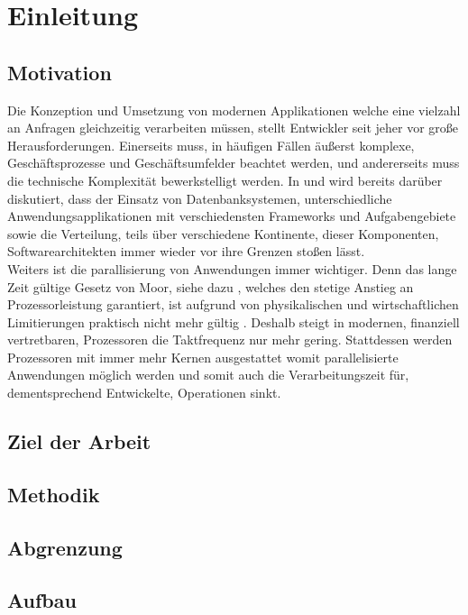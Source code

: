 \chapter{Einleitung}
\section{Motivation}
Die Konzeption und Umsetzung von modernen Applikationen welche eine vielzahl an Anfragen gleichzeitig verarbeiten müssen, stellt Entwickler seit jeher vor große Herausforderungen. Einerseits muss, in häufigen Fällen äußerst komplexe, Geschäftsprozesse und Geschäftsumfelder beachtet werden, und andererseits muss die technische Komplexität bewerkstelligt werden. In \cite{Vernon2015ReactiveAkka} und \cite{Evans2004Domain-drivenSoftware} wird bereits darüber diskutiert, dass der Einsatz von Datenbanksystemen, unterschiedliche Anwendungsapplikationen mit verschiedensten Frameworks und Aufgabengebiete sowie die Verteilung, teils über verschiedene Kontinente, dieser Komponenten, Softwarearchitekten immer wieder vor ihre Grenzen stoßen lässt. \\
Weiters ist die parallisierung von Anwendungen immer wichtiger. Denn das lange Zeit gültige Gesetz von Moor, siehe dazu \cite{moore1965moore}, welches den stetige Anstieg an Prozessorleistung garantiert, ist aufgrund von physikalischen und wirtschaftlichen Limitierungen praktisch nicht mehr gültig \cite{mann2000end}. Deshalb steigt in modernen, finanziell vertretbaren, Prozessoren die Taktfrequenz nur mehr gering. Stattdessen werden Prozessoren mit immer mehr Kernen ausgestattet womit parallelisierte Anwendungen möglich werden und somit auch die Verarbeitungszeit für, dementsprechend Entwickelte, Operationen sinkt.





\section{Ziel der Arbeit}

\section{Methodik}

\section{Abgrenzung}

\section{Aufbau}

